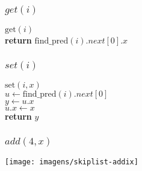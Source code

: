 \documentclass{beamer}
\begin{document}
\begin{frame}
\frametitle{$get(i)$}
\begin{oframed}
\begin{flushleft}
\hspace*{1em} \ensuremath{\mathrm{get}(\ensuremath{\mathit{i}})}\\

\hspace*{1em} \hspace*{1em} {\color{black} \textbf{return}} \ensuremath{\mathrm{find\_pred}(\ensuremath{\mathit{i}}).\ensuremath{\mathit{next}}[0].\ensuremath{\mathit{x}}}\\
\end{flushleft}
\end{oframed}
\end{frame}

\begin{frame}
\frametitle{$set(i)$}
\begin{oframed}
\begin{flushleft}
\hspace*{1em} \ensuremath{\mathrm{set}(\ensuremath{\mathit{i}}, \ensuremath{\mathit{x}})}\\

\hspace*{1em} \hspace*{1em} \ensuremath{\ensuremath{\mathit{u}} \gets  \ensuremath{\mathrm{find\_pred}(\ensuremath{\mathit{i}}).\ensuremath{\mathit{next}}[0]}}\\
\hspace*{1em} \hspace*{1em} \ensuremath{\ensuremath{\mathit{y}} \gets  \ensuremath{\ensuremath{\mathit{u}}.x}}\\
\hspace*{1em} \hspace*{1em} \ensuremath{\ensuremath{\mathit{u}}.\ensuremath{x} \gets  \ensuremath{x}}\\
\hspace*{1em} \hspace*{1em} {\color{black} \textbf{return}} \ensuremath{\ensuremath{\mathit{y}}}\\
\end{flushleft}
\end{oframed}
\end{frame}



\begin{frame}
\frametitle{$add(4,x)$}
\texttt{[image: imagens/skiplist-addix]}
\end{frame}
\end{document}
